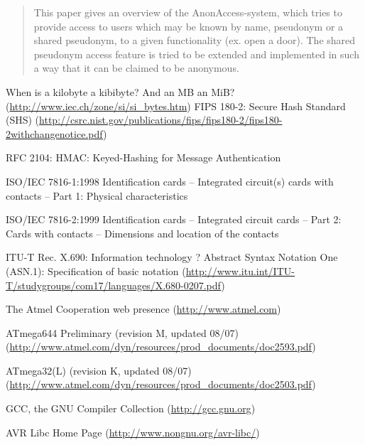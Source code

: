 \documentclass[10pt,a4paper]{article}
\begin{document}
\maketitle

\begin{abstract}
This paper gives an overview of the AnonAccess-system, which tries to provide access to users which may be known by name, pseudonym or a shared pseudonym, to a given functionality (ex. open a door). The shared pseudonym access feature is tried to be extended and implemented in such a way that it can be claimed to be anonymous.
\end{abstract}









\begin{appendix}


\end{appendix}
 
\newpage

\begin{thebibliography}{999}
 When is a kilobyte a kibibyte? And an MB an MiB? (\url{http://www.iec.ch/zone/si/si_bytes.htm})
 FIPS 180-2: Secure Hash Standard (SHS) (\url{http://csrc.nist.gov/publications/fips/fips180-2/fips180-2withchangenotice.pdf})
 
 RFC 2104: HMAC: Keyed-Hashing for Message Authentication

 ISO/IEC 7816-1:1998 Identification cards -- Integrated circuit(s) cards with contacts -- Part 1: Physical characteristics

 ISO/IEC 7816-2:1999 Identification cards -- Integrated circuit cards -- Part 2: Cards with contacts -- Dimensions and location of the contacts

 ITU-T Rec. X.690: Information technology ? Abstract Syntax Notation One (ASN.1): Specification of basic notation (\url{http://www.itu.int/ITU-T/studygroups/com17/languages/X.680-0207.pdf})

 The Atmel Cooperation web presence (\url{http://www.atmel.com})  

 ATmega644 Preliminary (revision M, updated 08/07)  (\url{http://www.atmel.com/dyn/resources/prod_documents/doc2593.pdf})

 ATmega32(L) (revision K, updated 08/07)  (\url{http://www.atmel.com/dyn/resources/prod_documents/doc2503.pdf})

 GCC, the GNU Compiler Collection (\url{http://gcc.gnu.org})
 
 AVR Libc Home Page (\url{http://www.nongnu.org/avr-libc/})
\end{thebibliography}
\end{document}
